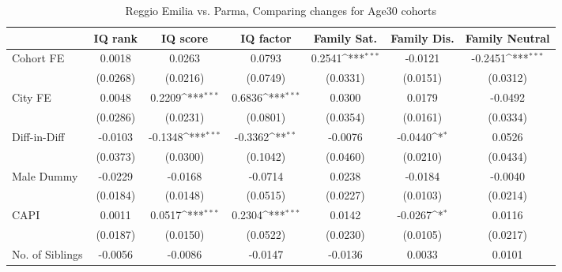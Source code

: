 \begin{table}[htbp]\centering
\def\sym#1{\ifmmode^{#1}\else\(^{#1}\)\fi}
\caption{Reggio Emilia vs. Parma, Comparing changes for Age30 cohorts}
\begin{tabular}{l*{6}{c}}
\toprule
            &\multicolumn{1}{c}{IQ rank}&\multicolumn{1}{c}{IQ score}&\multicolumn{1}{c}{IQ factor}&\multicolumn{1}{c}{Family Sat.}&\multicolumn{1}{c}{Family Dis.}&\multicolumn{1}{c}{Family Neutral}\\
\midrule
Cohort FE   &      0.0018         &      0.0263         &      0.0793         &      0.2541\sym{***}&     -0.0121         &     -0.2451\sym{***}\\
            &    (0.0268)         &    (0.0216)         &    (0.0749)         &    (0.0331)         &    (0.0151)         &    (0.0312)         \\
\addlinespace
City FE     &      0.0048         &      0.2209\sym{***}&      0.6836\sym{***}&      0.0300         &      0.0179         &     -0.0492         \\
            &    (0.0286)         &    (0.0231)         &    (0.0801)         &    (0.0354)         &    (0.0161)         &    (0.0334)         \\
\addlinespace
Diff-in-Diff&     -0.0103         &     -0.1348\sym{***}&     -0.3362\sym{**} &     -0.0076         &     -0.0440\sym{*}  &      0.0526         \\
            &    (0.0373)         &    (0.0300)         &    (0.1042)         &    (0.0460)         &    (0.0210)         &    (0.0434)         \\
\addlinespace
Male Dummy  &     -0.0229         &     -0.0168         &     -0.0714         &      0.0238         &     -0.0184         &     -0.0040         \\
            &    (0.0184)         &    (0.0148)         &    (0.0515)         &    (0.0227)         &    (0.0103)         &    (0.0214)         \\
\addlinespace
CAPI        &      0.0011         &      0.0517\sym{***}&      0.2304\sym{***}&      0.0142         &     -0.0267\sym{*}  &      0.0116         \\
            &    (0.0187)         &    (0.0150)         &    (0.0522)         &    (0.0230)         &    (0.0105)         &    (0.0217)         \\
\addlinespace
No. of Siblings&     -0.0056         &     -0.0086         &     -0.0147         &     -0.0136         &      0.0033         &      0.0101         \\

\end{tabular}
\end{table}
